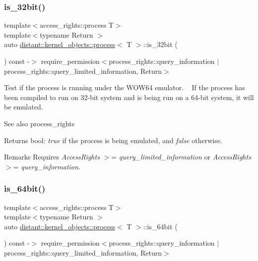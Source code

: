\subsubsection{\texorpdfstring{is\+\_\+32bit()}{is\_32bit()}}
{\footnotesize\ttfamily template$<$access\+\_\+rights\+::process T$>$ \\
template$<$typename Return $>$ \\
auto \mbox{\hyperlink{classdistant_1_1kernel__objects_1_1process}{distant\+::kernel\+\_\+objects\+::process}}$<$ T $>$\+::is\+\_\+32bit (\begin{DoxyParamCaption}{ }\end{DoxyParamCaption}) const -\/$>$ require\+\_\+permission$<$process\+\_\+rights\+::query\+\_\+information $\vert$ process\+\_\+rights\+::query\+\_\+limited\+\_\+information, Return$>$}



Test if the process is running under the W\+O\+W64 emulator. ~\newline
 If the process has been compiled to run on 32-\/bit system and is being run on a 64-\/bit system, it will be emulated. 

\begin{DoxySeeAlso}{See also}
process\+\_\+rights 
\end{DoxySeeAlso}
\begin{DoxyReturn}{Returns}
bool\+: {\itshape true} if the process is being emulated, and {\itshape false} otherwise. 
\end{DoxyReturn}
\begin{DoxyRemark}{Remarks}
Requires {\itshape Access\+Rights} $>$= {\itshape query\+\_\+limited\+\_\+information} or {\itshape Access\+Rights} $>$= {\itshape query\+\_\+information}. 
\end{DoxyRemark}
\mbox{\label{classdistant_1_1kernel__objects_1_1process_a9fc52566aa890d371eaedf82ad7a4868}} 
\subsubsection{\texorpdfstring{is\+\_\+64bit()}{is\_64bit()}}
{\footnotesize\ttfamily template$<$access\+\_\+rights\+::process T$>$ \\
template$<$typename Return $>$ \\
auto \mbox{\hyperlink{classdistant_1_1kernel__objects_1_1process}{distant\+::kernel\+\_\+objects\+::process}}$<$ T $>$\+::is\+\_\+64bit (\begin{DoxyParamCaption}{ }\end{DoxyParamCaption}) const -\/$>$ require\+\_\+permission$<$process\+\_\+rights\+::query\+\_\+information $\vert$ process\+\_\+rights\+::query\+\_\+limited\+\_\+information, Return$>$}



